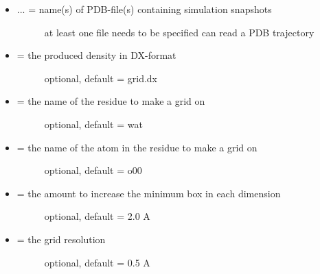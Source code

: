 \documentclass[letterpaper,10pt,english]{sphinxmanual}
\begin{document}
\begin{itemize}
\item {} \begin{description}
\item[{ ... = name(s) of PDB-file(s) containing simulation snapshots}] \leavevmode
at least one file needs to be specified
can read a PDB trajectory

\end{description}

\item {} \begin{description}
\item[{ = the produced density in DX-format}] \leavevmode
optional, default = grid.dx

\end{description}

\item {} \begin{description}
\item[{ = the name of the residue to make a grid on}] \leavevmode
optional, default = wat

\end{description}

\item {} \begin{description}
\item[{ = the name of the atom in the residue to make a grid on}] \leavevmode
optional, default = o00

\end{description}

\item {} \begin{description}
\item[{ = the amount to increase the minimum box in each dimension}] \leavevmode
optional, default = 2.0 A

\end{description}

\item {} \begin{description}
\item[{ = the grid resolution}] \leavevmode
optional, default = 0.5 A


\end{description}
\end{itemize}
\end{document}
